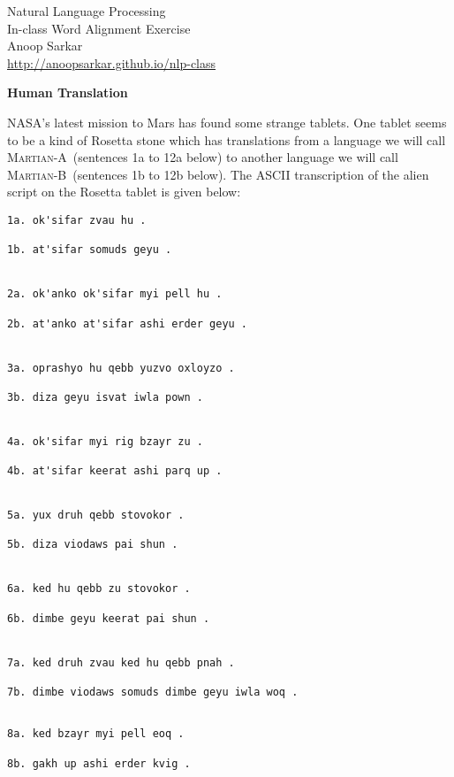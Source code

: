 \documentclass[11pt]{article}
\newcommand{\langa}{\textsc{Martian-A}}
\newcommand{\langb}{\textsc{Martian-B}}
\begin{document}
\begin{center}
{\Large Natural Language Processing}\\
{\large In-class Word Alignment Exercise}\\
{\small Anoop Sarkar}\\
\url{http://anoopsarkar.github.io/nlp-class}
\end{center}

\begin{exe}

\ex\label{kkex} \textbf{Human Translation} 

NASA's latest mission to Mars has found some strange
tablets. One tablet seems to be a kind of Rosetta stone which
has translations from a language we will call \langa\ 
(sentences 1a to 12a below)
to another language we will call \langb\ (sentences 1b to 12b below). 
The ASCII transcription of the alien script on the Rosetta tablet is given below:

\begin{center}
\begin{minipage}[t]{3.2in}
{\small\begin{verbatim}
1a. ok'sifar zvau hu .

1b. at'sifar somuds geyu .


2a. ok'anko ok'sifar myi pell hu .

2b. at'anko at'sifar ashi erder geyu .


3a. oprashyo hu qebb yuzvo oxloyzo .

3b. diza geyu isvat iwla pown .


4a. ok'sifar myi rig bzayr zu .

4b. at'sifar keerat ashi parq up .


5a. yux druh qebb stovokor .

5b. diza viodaws pai shun .


6a. ked hu qebb zu stovokor .

6b. dimbe geyu keerat pai shun .


7a. ked druh zvau ked hu qebb pnah .

7b. dimbe viodaws somuds dimbe geyu iwla woq .
\end{verbatim}
}
\end{minipage}
\begin{minipage}[t]{3in}
{\small\begin{verbatim}

8a. ked bzayr myi pell eoq .

8b. gakh up ashi erder kvig .



\end{verbatim}}
\end{minipage}
\end{center}
\end{exe}
\end{document}
